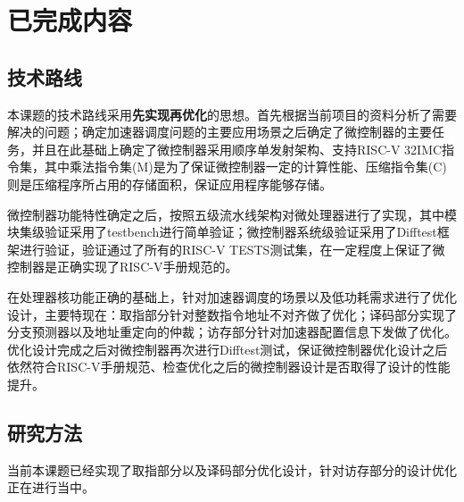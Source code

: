 \documentclass[a4paper, 12pt]{article}
\begin{document}

\clearpage
\section{已完成内容}%
\subsection{技术路线}%
本课题的技术路线采用\textbf{先实现再优化}的思想。首先根据当前项目的资料分析了需要解决的问题；确定加速器调度问题的主要应用场景之后确定了微控制器的主要任务，并且在此基础上确定了微控制器采用顺序单发射架构、支持RISC-V 32IMC指令集，其中乘法指令集(M)是为了保证微控制器一定的计算性能、压缩指令集(C)则是压缩程序所占用的存储面积，保证应用程序能够存储。

微控制器功能特性确定之后，按照五级流水线架构对微处理器进行了实现，其中模块集级验证采用了testbench进行简单验证；微控制器系统级验证采用了Difftest框架进行验证，验证通过了所有的RISC-V TESTS测试集，在一定程度上保证了微控制器是正确实现了RISC-V手册规范的。

在处理器核功能正确的基础上，针对加速器调度的场景以及低功耗\cite{8106976}需求进行了优化设计，主要特现在：取指部分针对整数指令地址不对齐做了优化；译码部分实现了分支预测器以及地址重定向的仲裁；访存部分针对加速器配置信息下发做了优化。优化设计完成之后对微控制器再次进行Difftest测试，保证微控制器优化设计之后依然符合RISC-V手册规范、检查优化之后的微控制器设计是否取得了设计的性能提升。
  
\clearpage
\subsection{研究方法}%
当前本课题已经实现了取指部分以及译码部分优化设计，针对访存部分的设计优化正在进行当中。
\end{document}
